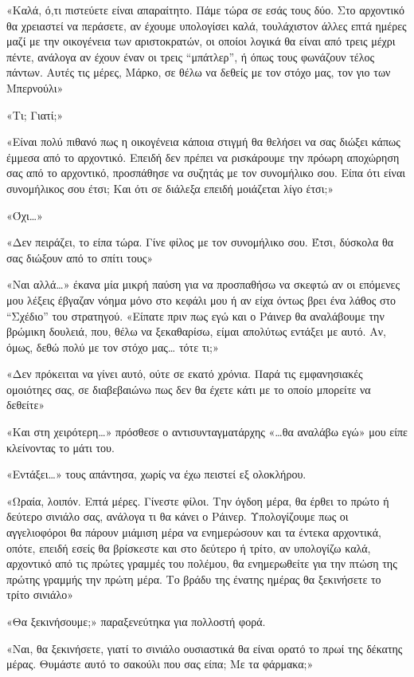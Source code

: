 \documentclass[12pt,twoside, openany]{book}
\begin{document}
«Καλά, ό,τι πιστεύετε είναι απαραίτητο. Πάμε τώρα σε εσάς τους δύο. Στο αρχοντικό θα χρειαστεί να περάσετε, αν έχουμε υπολογίσει καλά, τουλάχιστον άλλες επτά ημέρες μαζί με την οικογένεια των αριστοκρατών, οι οποίοι λογικά θα είναι από τρεις μέχρι πέντε, ανάλογα αν έχουν έναν οι τρεις “μπάτλερ”, ή όπως τους φωνάζουν τέλος πάντων. Αυτές τις μέρες, Μάρκο, σε θέλω να δεθείς με τον στόχο μας, τον γιο των Μπερνούλι»

«Τι; Γιατί;»

«Είναι πολύ πιθανό πως η οικογένεια κάποια στιγμή θα θελήσει να σας διώξει κάπως έμμεσα από το αρχοντικό. Επειδή δεν πρέπει να ρισκάρουμε την πρόωρη αποχώρηση σας από το αρχοντικό, προσπάθησε να συζητάς με τον συνομήλικο σου. Είπα ότι είναι συνομήλικος σου έτσι; Και ότι σε διάλεξα επειδή μοιάζεται λίγο έτσι;»

«Όχι…»

«Δεν πειράζει, το είπα τώρα. Γίνε φίλος με τον συνομήλικο σου. Έτσι, δύσκολα θα σας διώξουν από το σπίτι τους»

«Ναι αλλά…» έκανα μία μικρή παύση για να προσπαθήσω να σκεφτώ αν οι επόμενες μου λέξεις έβγαζαν νόημα μόνο στο κεφάλι μου ή αν είχα όντως βρει ένα λάθος στο “Σχέδιο” του στρατηγού. «Είπατε πριν πως εγώ και ο Ράινερ θα αναλάβουμε την βρώμικη δουλειά, που, θέλω να ξεκαθαρίσω, είμαι απολύτως εντάξει με αυτό. Αν, όμως, δεθώ πολύ με τον στόχο μας… τότε τι;»

«Δεν πρόκειται να γίνει αυτό, ούτε σε εκατό χρόνια. Παρά τις εμφανησιακές ομοιότηες σας, σε διαβεβαιώνω πως δεν θα έχετε κάτι με το οποίο μπορείτε να δεθείτε»

«Και στη χειρότερη…» πρόσθεσε ο αντισυνταγματάρχης «…θα αναλάβω εγώ» μου είπε κλείνοντας το μάτι του.

«Εντάξει…» τους απάντησα, χωρίς να έχω πειστεί εξ ολοκλήρου.

«Ωραία, λοιπόν. Επτά μέρες. Γίνεστε φίλοι. Την όγδοη μέρα, θα έρθει το πρώτο ή δεύτερο σινιάλο σας, ανάλογα τι θα κάνει ο Ράινερ. Υπολογίζουμε πως οι αγγελιοφόροι θα πάρουν μιάμιση μέρα να ενημερώσουν και τα έντεκα αρχοντικά, οπότε, επειδή εσείς θα βρίσκεστε και στο δεύτερο ή τρίτο, αν υπολογίζω καλά, αρχοντικό από τις πρώτες γραμμές του πολέμου, θα ενημερωθείτε για την πτώση της πρώτης γραμμής την πρώτη μέρα. Το βράδυ της ένατης ημέρας θα ξεκινήσετε το τρίτο σινιάλο»

«Θα ξεκινήσουμε;» παραξενεύτηκα για πολλοστή φορά.

«Ναι, θα ξεκινήσετε, γιατί το σινιάλο ουσιαστικά θα είναι ορατό το πρωί της δέκατης μέρας. Θυμάστε αυτό το σακούλι που σας είπα; Με τα φάρμακα;»
\end{document}
